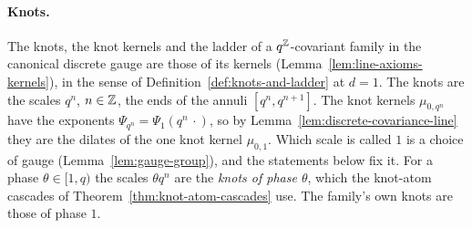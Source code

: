\paragraph{Knots.} The knots, the knot kernels and the ladder of a $q^{\mathbb{Z}}$-covariant family in
the canonical discrete gauge are those of its kernels (Lemma~\ref{lem:line-axioms-kernels}), in
the sense of Definition~\ref{def:knots-and-ladder} at $d = 1$. The knots are the scales $q^n$,
$n \in \mathbb{Z}$, the ends of the annuli $[q^n, q^{n+1}]$. The knot kernels $\mu_{0,q^n}$ have the
exponents $\Psi_{q^n} = \Psi_1(q^n\,\cdot)$, so by Lemma~\ref{lem:discrete-covariance-line} they
are the dilates of the one knot kernel $\mu_{0,1}$. Which scale is called $1$ is a choice of gauge
(Lemma~\ref{lem:gauge-group}), and the statements below fix it. For a phase $\theta \in [1,q)$
the scales $\theta q^n$ are the \emph{knots of phase $\theta$}, which the knot-atom cascades of
Theorem~\ref{thm:knot-atom-cascades} use. The family's own knots are those of phase $1$.

